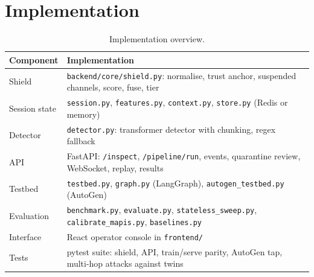 \section{Implementation}
\begin{table}[H]
\centering\small
\begin{tabular}{p{4.4cm}p{8.3cm}}
\toprule
Component & Implementation\\
\midrule
Shield & \texttt{backend/core/shield.py}: normalise, trust anchor, suspended channels, score, fuse, tier\\
Session state & \texttt{session.py}, \texttt{features.py}, \texttt{context.py}, \texttt{store.py} (Redis or memory)\\
Detector & \texttt{detector.py}: transformer detector with chunking, regex fallback\\
API & FastAPI: \texttt{/inspect}, \texttt{/pipeline/run}, events, quarantine review, WebSocket, replay, results\\
Testbed & \texttt{testbed.py}, \texttt{graph.py} (LangGraph), \texttt{autogen\_testbed.py} (AutoGen)\\
Evaluation & \texttt{benchmark.py}, \texttt{evaluate.py}, \texttt{stateless\_sweep.py}, \texttt{calibrate\_mapis.py}, \texttt{baselines.py}\\
Interface & React operator console in \texttt{frontend/}\\
Tests & pytest suite: shield, API, train/serve parity, AutoGen tap, multi-hop attacks against twins\\
\bottomrule
\end{tabular}
\caption{Implementation overview.}
\end{table}

